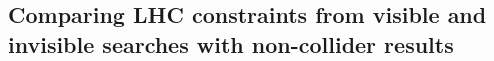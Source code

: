 




\subsection{Comparing LHC constraints from visible and invisible searches with non-collider results}



